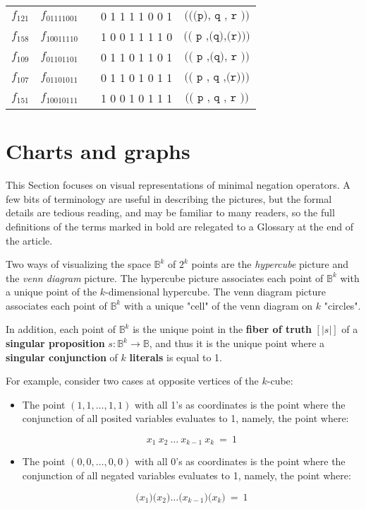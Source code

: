 \documentclass[12pt]{article}
\begin{document}
\begin{center}
\begin{tabular}{|c|c|c|c|c|}
\\[2pt]
$f_{121}$ & $f_{01111001}$ &       & 0 1 1 1 1 0 0 1 & $\texttt{(((p),~q~,~r~))}$
\\[2pt]
$f_{158}$ & $f_{10011110}$ &       & 1 0 0 1 1 1 1 0 & $\texttt{((~p~,(q),(r)))}$
\\[2pt]
$f_{109}$ & $f_{01101101}$ &       & 0 1 1 0 1 1 0 1 & $\texttt{((~p~,(q),~r~))}$
\\[2pt]
$f_{107}$ & $f_{01101011}$ &       & 0 1 1 0 1 0 1 1 & $\texttt{((~p~,~q~,(r)))}$
\\[2pt]
$f_{151}$ & $f_{10010111}$ &       & 1 0 0 1 0 1 1 1 & $\texttt{((~p~,~q~,~r~))}$
\\[2pt]\hline
\end{tabular}
\end{center}

\section{Charts and graphs}

This Section focuses on visual representations of minimal negation operators.  A few bits of terminology are useful in describing the pictures, but the formal details are tedious reading, and may be familiar to many readers, so the full definitions of the terms marked in bold are relegated to a Glossary at the end of the article.

Two ways of visualizing the space $\mathbb{B}^k$ of $2^k$ points are the \textit{hypercube} picture and the \textit{venn diagram} picture.  The hypercube picture associates each point of $\mathbb{B}^k$ with a unique point of the $k$-dimensional hypercube.  The venn diagram picture associates each point of $\mathbb{B}^k$ with a unique "cell" of the venn diagram on $k$ "circles". 

In addition, each point of $\mathbb{B}^k$ is the unique point in the \textbf{fiber of truth} $[|s|]$ of a \textbf{singular proposition} $s : \mathbb{B}^k \to \mathbb{B}$, and thus it is the unique point where a \textbf{singular conjunction} of $k$ \textbf{literals} is equal to 1.

For example, consider two cases at opposite vertices of the $k$-cube:

\begin{itemize}

\item
The point $(1, 1, \ldots, 1, 1)$ with all 1's as coordinates is the point where the conjunction of all posited variables evaluates to 1, namely, the point where:

\[ x_1 ~ x_2 ~\ldots~ x_{k-1} ~ x_k ~=~ 1 \]

\item
The point $(0, 0, \ldots, 0, 0)$ with all 0's as coordinates is the point where the conjunction of all negated variables evaluates to 1, namely, the point where:

\[ \texttt{(} x_1 \texttt{)(} x_2 \texttt{)} \ldots \texttt{(} x_{k-1} \texttt{)(} x_k \texttt{)} ~=~ 1 \]

\end{itemize}
\end{document}
